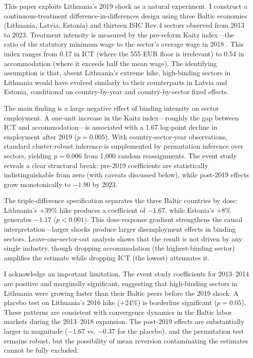 \documentclass[12pt]{article}
\begin{document}
This paper exploits Lithuania's 2019 shock as a natural experiment. I construct a continuous-treatment difference-in-differences design using three Baltic economies (Lithuania, Latvia, Estonia) and thirteen ISIC Rev.4 sectors observed from 2013 to 2023. Treatment intensity is measured by the pre-reform Kaitz index---the ratio of the statutory minimum wage to the sector's average wage in 2018 \citep{kaitz1970experience}. This index ranges from 0.17 in ICT (where the 555 EUR floor is irrelevant) to 0.54 in accommodation (where it exceeds half the mean wage). The identifying assumption is that, absent Lithuania's extreme hike, high-binding sectors in Lithuania would have evolved similarly to their counterparts in Latvia and Estonia, conditional on country-by-year and country-by-sector fixed effects.

The main finding is a large negative effect of binding intensity on sector employment. A one-unit increase in the Kaitz index---roughly the gap between ICT and accommodation---is associated with a 1.67 log-point decline in employment after 2019 ($p = 0.005$). With country-sector-year observations, standard cluster-robust inference is supplemented by permutation inference over sectors, yielding $p = 0.006$ from 1,000 random reassignments. The event study reveals a clear structural break: pre-2019 coefficients are statistically indistinguishable from zero (with caveats discussed below), while post-2019 effects grow monotonically to $-1.90$ by 2023.

The triple-difference specification separates the three Baltic countries by dose: Lithuania's +39\% hike produces a coefficient of $-1.67$, while Estonia's +8\% generates $-1.17$ ($p < 0.001$). This dose-response gradient strengthens the causal interpretation---larger shocks produce larger disemployment effects in binding sectors. Leave-one-sector-out analysis shows that the result is not driven by any single industry, though dropping accommodation (the highest-binding sector) amplifies the estimate while dropping ICT (the lowest) attenuates it.

I acknowledge an important limitation. The event study coefficients for 2013--2014 are positive and marginally significant, suggesting that high-binding sectors in Lithuania were growing faster than their Baltic peers before the 2019 shock. A placebo test on Lithuania's 2016 hike (+24\%) is borderline significant ($p = 0.05$). These patterns are consistent with convergence dynamics in the Baltic labor markets during the 2013--2018 expansion. The post-2019 effects are substantially larger in magnitude ($-1.67$ vs. $-0.37$ for the placebo), and the permutation test remains robust, but the possibility of mean reversion contaminating the estimates cannot be fully excluded.
\end{document}

